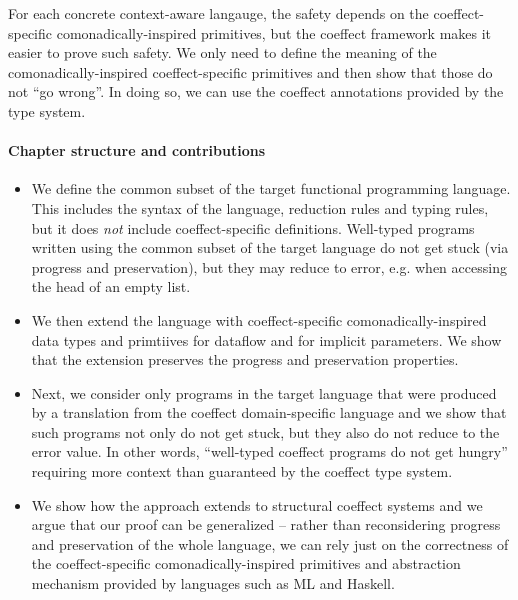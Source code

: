 \documentclass[
		twoside,openright,titlepage,numbers=noenddot,headinclude,%
                footinclude=true,cleardoublepage=empty,
                BCOR=10mm,paper=a4,fontsize=10pt, %
                ngerman,american, %
                ]{scrreprt}
\newcommand{\ident}[1]{\textnormal{\sffamily #1}}
\begin{document}
For each concrete context-aware langauge, the safety depends on the coeffect-specific 
comonadically-inspired primitives, but the coeffect framework makes it easier to prove such safety.
We only need to define the meaning of the comonadically-inspired coeffect-specific primitives
and then show that those do not ``go wrong''. In doing so, we can use the coeffect annotations
provided by the type system. 

\paragraph{Chapter structure and contributions}

\begin{itemize}
\item 
  We define the common subset of the target functional programming language. This includes the
  syntax of the language, reduction rules and typing rules, but it does \emph{not} include 
  coeffect-specific definitions. Well-typed programs written using the common subset of the 
  target language do not get stuck (via progress and preservation), but they may reduce to 
  \ident{error}, e.g. when accessing the head of an empty list.
  
\item We then extend the language with coeffect-specific comonadically-inspired
  data types and primtiives for dataflow and for implicit parameters. We show that the extension
  preserves the progress and preservation properties. 
  
\item Next, we consider only programs in the target language that were produced by a
  translation from the coeffect domain-specific language and we show that such programs not only
  do not get stuck, but they also do not reduce to the \ident{error} value. In other words,
  ``well-typed coeffect programs do not get hungry'' requiring more context than guaranteed
  by the coeffect type system.

\item We show how the approach extends to structural coeffect systems and we argue that our
  proof can be generalized -- rather than reconsidering progress and preservation of the 
  whole language, we can rely just on the correctness of the coeffect-specific comonadically-inspired
  primitives and abstraction mechanism provided by languages such as ML and Haskell.  
\end{itemize}  

\end{document}
